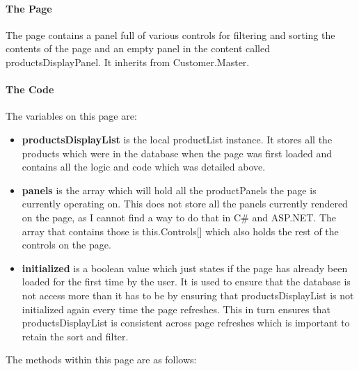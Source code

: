 ﻿\documentclass{article}
\begin{document}
    \paragraph{The Page}
    The page contains a panel full of various controls for filtering and sorting the contents of the page and an empty panel in the content called productsDisplayPanel.
    It inherits from Customer.Master.
    \paragraph{The Code}
    The variables on this page are:
    \begin{itemize}
        \item \textbf{productsDisplayList} is the local productList instance.
        It stores all the products which were in the database when the page was first loaded and contains all the logic and code which was detailed above.
        \item \textbf{panels} is the array which will hold all the productPanels the page is currently operating on.
        This does not store all the panels currently rendered on the page, as I cannot find a way to do that in C\# and ASP.NET.
        The array that contains those is this.Controls[] which also holds the rest of the controls on the page.
        \item \textbf{initialized} is a boolean value which just states if the page has already been loaded for the first time by the user.
        It is used to ensure that the database is not access more than it has to be by ensuring that productsDisplayList is not initialized again every time the page refreshes.
        This in turn ensures that productsDisplayList is consistent across page refreshes which is important to retain the sort and filter.
    \end{itemize}
    The methods within this page are as follows:
\end{document}
